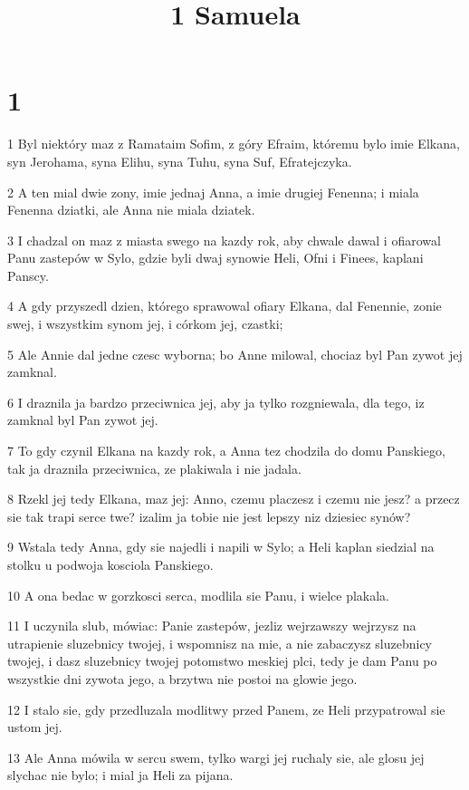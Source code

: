 

\title{1 Samuela}


\chapter{1}

\par 1 Byl niektóry maz z Ramataim Sofim, z góry Efraim, któremu bylo imie Elkana, syn Jerohama, syna Elihu, syna Tuhu, syna Suf, Efratejczyka.
\par 2 A ten mial dwie zony, imie jednaj Anna, a imie drugiej Fenenna; i miala Fenenna dziatki, ale Anna nie miala dziatek.
\par 3 I chadzal on maz z miasta swego na kazdy rok, aby chwale dawal i ofiarowal Panu zastepów w Sylo, gdzie byli dwaj synowie Heli, Ofni i Finees, kaplani Panscy.
\par 4 A gdy przyszedl dzien, którego sprawowal ofiary Elkana, dal Fenennie, zonie swej, i wszystkim synom jej, i córkom jej, czastki;
\par 5 Ale Annie dal jedne czesc wyborna; bo Anne milowal, chociaz byl Pan zywot jej zamknal.
\par 6 I draznila ja bardzo przeciwnica jej, aby ja tylko rozgniewala, dla tego, iz zamknal byl Pan zywot jej.
\par 7 To gdy czynil Elkana na kazdy rok, a Anna tez chodzila do domu Panskiego, tak ja draznila przeciwnica, ze plakiwala i nie jadala.
\par 8 Rzekl jej tedy Elkana, maz jej: Anno, czemu placzesz i czemu nie jesz? a przecz sie tak trapi serce twe? izalim ja tobie nie jest lepszy niz dziesiec synów?
\par 9 Wstala tedy Anna, gdy sie najedli i napili w Sylo; a Heli kaplan siedzial na stolku u podwoja kosciola Panskiego.
\par 10 A ona bedac w gorzkosci serca, modlila sie Panu, i wielce plakala.
\par 11 I uczynila slub, mówiac: Panie zastepów, jezliz wejrzawszy wejrzysz na utrapienie sluzebnicy twojej, i wspomnisz na mie, a nie zabaczysz sluzebnicy twojej, i dasz sluzebnicy twojej potomstwo meskiej plci, tedy je dam Panu po wszystkie dni zywota jego, a brzytwa nie postoi na glowie jego.
\par 12 I stalo sie, gdy przedluzala modlitwy przed Panem, ze Heli przypatrowal sie ustom jej.
\par 13 Ale Anna mówila w sercu swem, tylko wargi jej ruchaly sie, ale glosu jej slychac nie bylo; i mial ja Heli za pijana.
